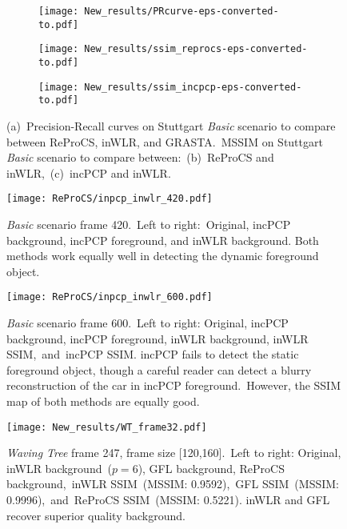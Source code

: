 \documentclass[10pt,twocolumn,letterpaper]{article}
\begin{document}
\begin{figure*}%
\centering
\begin{subfigure}{.67\columnwidth}
\texttt{[image: New\_results/PRcurve-eps-converted-to.pdf]}%
\caption{}%
\label{reprocs_roc}
\end{subfigure}\hfill%
\begin{subfigure}{.67\columnwidth}
\texttt{[image: New\_results/ssim\_reprocs-eps-converted-to.pdf]}%
\caption{}%
\label{ssim_reprocs}
\end{subfigure}\hfill%
\begin{subfigure}{.67\columnwidth}
\texttt{[image: New\_results/ssim\_incpcp-eps-converted-to.pdf]}%
\caption{}%
\label{ssim_incpcp}
\end{subfigure}%
\caption{(a)~Precision-Recall curves on Stuttgart {\it Basic} scenario to compare between ReProCS, inWLR, and GRASTA.~MSSIM on Stuttgart {\it Basic} scenario to compare between:~(b)~ReProCS and inWLR,~(c)~incPCP and inWLR.}
\label{figabc}
\end{figure*}
\begin{figure}
    \centering
    \texttt{[image: ReProCS/inpcp\_inwlr\_420.pdf]}
    \caption{{\it Basic} scenario frame 420.~Left to right:~Original, incPCP background, incPCP foreground, and inWLR background. Both methods work equally well in detecting the dynamic foreground object.}
    \label{bg420_incpcp}
\end{figure}
\begin{figure*}
    \centering
    \texttt{[image: ReProCS/inpcp\_inwlr\_600.pdf]}
    \caption{{\it Basic} scenario frame 600.~Left to right: Original, incPCP background, incPCP foreground, inWLR background, inWLR SSIM,~and~incPCP SSIM. incPCP fails to detect the static foreground object, though a careful reader can detect a blurry reconstruction of the car in incPCP foreground.~However, the SSIM map of both methods are equally good.}
    \label{bg600_incpcp}
\end{figure*}
\begin{figure*}
    \centering
    \texttt{[image: New\_results/WT\_frame32.pdf]}
    \caption{{\it Waving Tree} frame 247, frame size [120,160].~Left to right: Original, inWLR background~($p=6$), GFL background, ReProCS background,~inWLR SSIM~(MSSIM: 0.9592),~GFL SSIM~(MSSIM: 0.9996),~and~ReProCS SSIM~(MSSIM: 0.5221). inWLR and GFL recover superior quality background.}
    \label{waving_tree}
\end{figure*}
\vspace{-0.0in}
\end{document}
